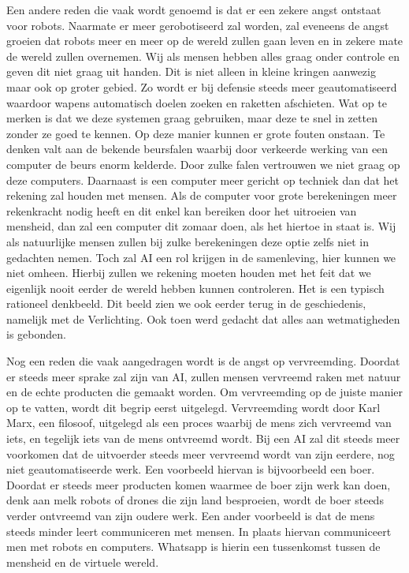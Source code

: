 \documentclass{article}
\begin{document}
Een andere reden die vaak wordt genoemd is dat er een zekere angst ontstaat voor robots. Naarmate er meer gerobotiseerd zal worden, zal eveneens de angst groeien dat robots meer en meer op de wereld zullen gaan leven en in zekere mate de wereld zullen overnemen. Wij als mensen hebben alles graag onder controle en geven dit niet graag uit handen. Dit is niet alleen in kleine kringen aanwezig maar ook op groter gebied. Zo wordt er bij defensie steeds meer geautomatiseerd waardoor wapens automatisch doelen zoeken en raketten afschieten. Wat op te merken is dat we deze systemen graag gebruiken, maar deze te snel in zetten zonder ze goed te kennen. Op deze manier kunnen er grote fouten onstaan. Te denken valt aan de bekende beursfalen\cite{vriendofvijand} waarbij door verkeerde werking van een computer de beurs enorm kelderde. Door zulke falen vertrouwen we niet graag op deze computers. Daarnaast is een computer meer gericht op techniek dan dat het rekening zal houden met mensen. Als de computer voor grote berekeningen meer rekenkracht nodig heeft en dit enkel kan bereiken door het uitroeien van mensheid, dan zal een computer dit zomaar doen, als het hiertoe in staat is. Wij als natuurlijke mensen zullen bij zulke berekeningen deze optie zelfs niet in gedachten nemen. Toch zal AI een rol krijgen in de samenleving, hier kunnen we niet omheen. Hierbij zullen we rekening moeten houden met het feit dat we eigenlijk nooit eerder de wereld hebben kunnen controleren. Het is een typisch rationeel denkbeeld. Dit beeld zien we ook eerder terug in de geschiedenis, namelijk met de Verlichting. Ook toen werd gedacht dat alles aan wetmatigheden is gebonden.

Nog een reden die vaak aangedragen wordt is de angst op vervreemding. Doordat er steeds meer sprake zal zijn van AI, zullen mensen vervreemd raken met natuur en de echte producten die gemaakt worden. Om vervreemding op de juiste manier op te vatten, wordt dit begrip eerst uitgelegd. Vervreemding wordt door Karl Marx\cite{vriendofvijand}, een filosoof, uitgelegd als een proces waarbij de mens zich vervreemd van iets, en tegelijk iets van de mens ontvreemd wordt. Bij een AI zal dit steeds meer voorkomen dat de uitvoerder steeds meer vervreemd wordt van zijn eerdere, nog niet geautomatiseerde werk. Een voorbeeld hiervan is bijvoorbeeld een boer. Doordat er steeds meer producten komen waarmee de boer zijn werk kan doen, denk aan melk robots of drones die zijn land besproeien, wordt de boer steeds verder ontvreemd van zijn oudere werk. Een ander voorbeeld is dat de mens steeds minder leert communiceren met mensen. In plaats hiervan communiceert men met robots en computers. Whatsapp is hierin een tussenkomst tussen de mensheid en de virtuele wereld. 
\end{document}
